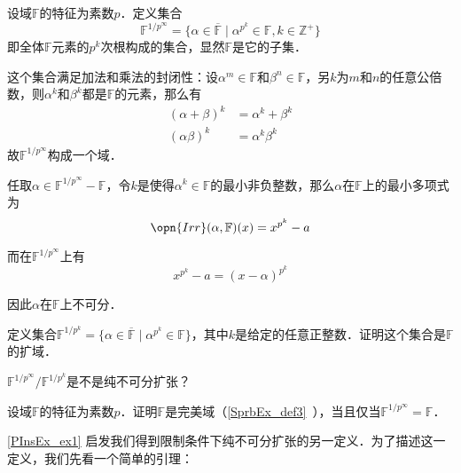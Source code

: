 \begin{example}{}\label{PInsEx_ex1}
设域$\mathbb{F}$的特征为素数$p$．定义集合
\begin{equation}
\mathbb{F}^{1/p^\infty} = \{\alpha\in\overline{\mathbb{F}}\mid \alpha^{p^k}\in\mathbb{F}, k\in\mathbb{Z}^+\}
\end{equation}
即全体$\mathbb{F}$元素的$p^k$次根构成的集合，显然$\mathbb{F}$是它的子集．

这个集合满足加法和乘法的封闭性：设$\alpha^m\in\mathbb{F}$和$\beta^n\in\mathbb{F}$，另$k$为$m$和$n$的任意公倍数，则$\alpha^k$和$\beta^k$都是$\mathbb{F}$的元素，那么有
\begin{equation}
\begin{aligned}
(\alpha+\beta)^k&=\alpha^k+\beta^k\\
(\alpha\beta)^k&=\alpha^k\beta^k
\end{aligned}
\end{equation}
故$\mathbb{F}^{1/p^\infty}$构成一个域．

任取$\alpha\in\mathbb{F}^{1/p^\infty}-\mathbb{F}$，令$k$是使得$\alpha^k\in\mathbb{F}$的最小非负整数，那么$\alpha$在$\mathbb{F}$上的最小多项式为
\begin{equation}
\opn{Irr}(\alpha, \mathbb{F})(x) = x^{p^k}-a
\end{equation}

而在$\mathbb{F}^{1/p^\infty}$上有
\begin{equation}
x^{p^k}-a = (x-\alpha)^{p^k}
\end{equation}

因此$\alpha$在$\mathbb{F}$上不可分．

\end{example}



\begin{exercise}{}
定义集合$\mathbb{F}^{1/p^k}=\{\alpha\in\overline{\mathbb{F}}\mid \alpha^{p^k}\in\mathbb{F}\}$，其中$k$是给定的任意正整数．证明这个集合是$\mathbb{F}$的扩域．

$\mathbb{F}^{1/p^\infty}/\mathbb{F}^{1/p^k}$是不是纯不可分扩张？
\end{exercise}


\begin{exercise}{}
设域$\mathbb{F}$的特征为素数$p$．证明$\mathbb{F}$是完美域（\autoref{SprbEx_def3}~），当且仅当$\mathbb{F}^{1/p^\infty}=\mathbb{F}$．
\end{exercise}



\autoref{PInsEx_ex1} 启发我们得到限制条件下纯不可分扩张的另一定义．为了描述这一定义，我们先看一个简单的引理：

